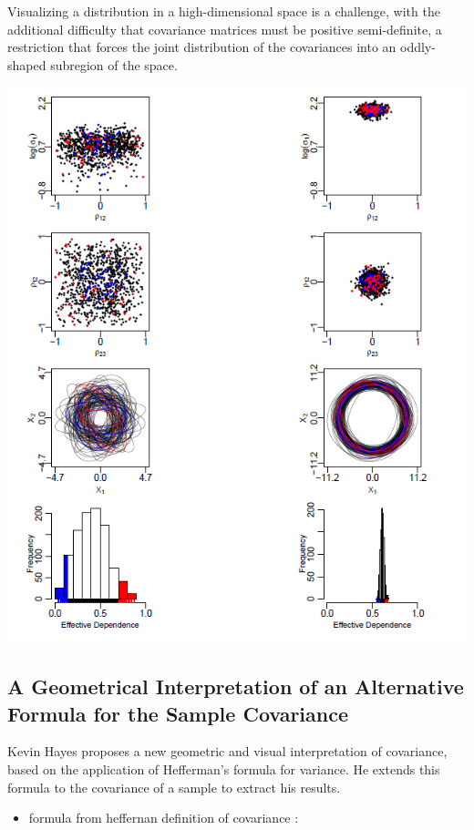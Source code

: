 \documentclass[
]{report}
\providecommand{\tightlist}{%
  \setlength{\itemsep}{0pt}\setlength{\parskip}{0pt}}
\begin{document}
Visualizing a distribution in a high-dimensional space is a challenge, with the additional
difficulty that covariance matrices must be positive semi-definite, a restriction that forces
the joint distribution of the covariances into an oddly-shaped subregion of the space.

\includegraphics{wtf_covViz.PNG}

\hypertarget{a-geometrical-interpretation-of-an-alternative-formula-for-the-sample-covariance}{%
\subsection{A Geometrical Interpretation of an Alternative Formula for the Sample Covariance}\label{a-geometrical-interpretation-of-an-alternative-formula-for-the-sample-covariance}}

Kevin Hayes \citep{Hayes} proposes a new geometric and visual interpretation of covariance, based on the application of Hefferman's formula for variance. He extends this formula to the covariance of a sample to extract his results.

\begin{itemize}
\tightlist
\item
  formula from heffernan definition of covariance :
\end{itemize}
\end{document}
